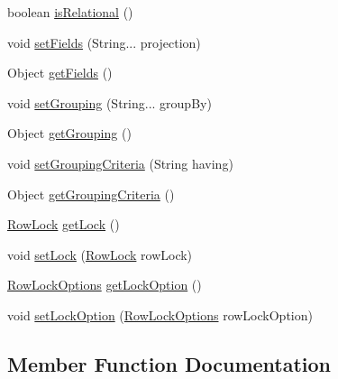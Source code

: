 \begin{DoxyCompactItemize}
\item 
boolean \mbox{\hyperlink{interfacecom_1_1mysql_1_1cj_1_1xdevapi_1_1_find_params_a8d9672b341239c8b17a9420e18150775}{is\+Relational}} ()
\item 
void \mbox{\hyperlink{interfacecom_1_1mysql_1_1cj_1_1xdevapi_1_1_find_params_a8326dbc363863872a177b89345f6f419}{set\+Fields}} (String... projection)
\item 
Object \mbox{\hyperlink{interfacecom_1_1mysql_1_1cj_1_1xdevapi_1_1_find_params_aac3a5fc922164eb993ace388ab96ea68}{get\+Fields}} ()
\item 
void \mbox{\hyperlink{interfacecom_1_1mysql_1_1cj_1_1xdevapi_1_1_find_params_aa46e8ed801545f8754432715812c1bde}{set\+Grouping}} (String... group\+By)
\item 
Object \mbox{\hyperlink{interfacecom_1_1mysql_1_1cj_1_1xdevapi_1_1_find_params_a15fa515ae7f34cb307895ce4fa136bcd}{get\+Grouping}} ()
\item 
void \mbox{\hyperlink{interfacecom_1_1mysql_1_1cj_1_1xdevapi_1_1_find_params_a5f520024fb2633d0ab42d573c7aeac03}{set\+Grouping\+Criteria}} (String having)
\item 
Object \mbox{\hyperlink{interfacecom_1_1mysql_1_1cj_1_1xdevapi_1_1_find_params_a110c833cc33c7f15da0eda4e12f946cf}{get\+Grouping\+Criteria}} ()
\item 
\mbox{\hyperlink{enumcom_1_1mysql_1_1cj_1_1xdevapi_1_1_find_params_1_1_row_lock}{Row\+Lock}} \mbox{\hyperlink{interfacecom_1_1mysql_1_1cj_1_1xdevapi_1_1_find_params_a4b415ce43977c05c58ed209b5d200c27}{get\+Lock}} ()
\item 
void \mbox{\hyperlink{interfacecom_1_1mysql_1_1cj_1_1xdevapi_1_1_find_params_a7fe3613c0ce317de5b1ae07772d88844}{set\+Lock}} (\mbox{\hyperlink{enumcom_1_1mysql_1_1cj_1_1xdevapi_1_1_find_params_1_1_row_lock}{Row\+Lock}} row\+Lock)
\item 
\mbox{\hyperlink{enumcom_1_1mysql_1_1cj_1_1xdevapi_1_1_find_params_1_1_row_lock_options}{Row\+Lock\+Options}} \mbox{\hyperlink{interfacecom_1_1mysql_1_1cj_1_1xdevapi_1_1_find_params_a8e6ab7c549b8fd7427416bf908c7ab2e}{get\+Lock\+Option}} ()
\item 
void \mbox{\hyperlink{interfacecom_1_1mysql_1_1cj_1_1xdevapi_1_1_find_params_ac8aeb07d03a738ecb454c8897e4706ad}{set\+Lock\+Option}} (\mbox{\hyperlink{enumcom_1_1mysql_1_1cj_1_1xdevapi_1_1_find_params_1_1_row_lock_options}{Row\+Lock\+Options}} row\+Lock\+Option)
\end{DoxyCompactItemize}


\subsection{Member Function Documentation}
\mbox{\label{interfacecom_1_1mysql_1_1cj_1_1xdevapi_1_1_find_params_acfde0b00091fcfdf4728c009f39c9951}} 
